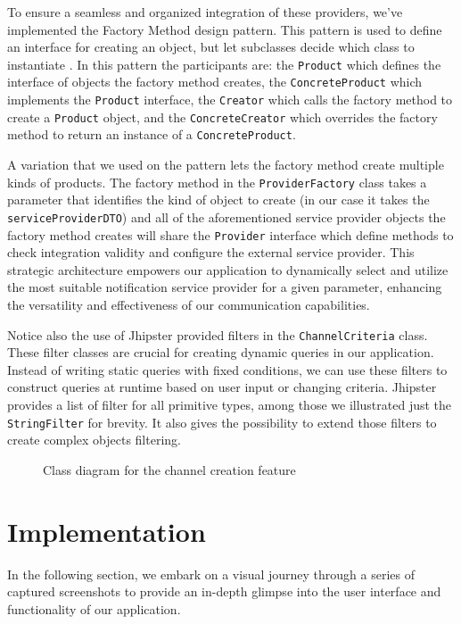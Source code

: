 To ensure a seamless and organized integration of these providers, we've implemented the
Factory Method design pattern. This pattern is used to define an interface for creating an object,
but let subclasses decide which class to instantiate \cite{patterns}. In this pattern the participants are:
the \texttt{Product} which defines the interface of objects the factory method creates, the
\texttt{ConcreteProduct} which implements the \texttt{Product} interface, the \texttt{Creator} which
calls the factory method to create a \texttt{Product} object, and the \texttt{ConcreteCreator} which overrides
the factory method to return an instance of a \texttt{ConcreteProduct}.

A variation that we used on the pattern lets the factory method create multiple kinds of products.
The factory method in the \texttt{ProviderFactory} class takes a parameter that identifies the kind of object
to create (in our case it takes the \texttt{serviceProviderDTO}) and all of the
aforementioned service provider objects the factory method creates will share the \texttt{Provider} interface
which define methods to check integration validity and configure the external service provider.
This strategic architecture empowers our application to dynamically select and utilize the most suitable
notification service provider for a given parameter, enhancing the versatility and effectiveness of
our communication capabilities.

Notice also the use of Jhipster provided filters in the \texttt{ChannelCriteria} class. These filter
classes are crucial for creating dynamic queries in our application. Instead of writing static queries
with fixed conditions, we can use these filters to construct queries at runtime based on user input
or changing criteria. Jhipster provides a list of filter for all primitive types, among those we illustrated
just the \texttt{StringFilter} for brevity. It also gives the possibility to extend those filters
to create complex objects filtering.

\begin{landscape}
    \begin{figure}[hbt!]
        \centering
        
        \caption{Class diagram for the channel creation feature}
        \label{detailed-1}
    \end{figure}
\end{landscape}


\section{Implementation}
In the following section, we embark on a visual journey through a series of captured screenshots to provide
an in-depth glimpse into the user interface and functionality of our application.


